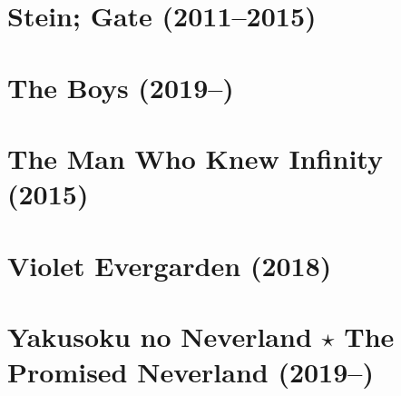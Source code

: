 \documentclass{book}
\numberwithin{equation}{section}
\begin{document}

\chapter{Stein; Gate (2011--2015)}


\chapter{The Boys (2019--)}


\chapter{The Man Who Knew Infinity (2015)}


\chapter{Violet Evergarden (2018)}


\chapter{Yakusoku no Neverland $\star$ The Promised Neverland (2019--)}


\printbibliography[heading=bibintoc]
\end{document}
